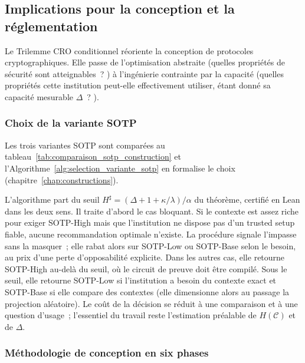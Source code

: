 \subsection{Implications pour la conception et la r\'eglementation}
\label{subsec:implications_conception}
\begin{sloppypar}
Le Trilemme CRO conditionnel r\'eoriente la conception de protocoles
cryptographiques. Elle passe de l'optimisation abstraite (\og quelles propri\'et\'es
de s\'ecurit\'e sont atteignables~? \fg) \`a l'ing\'enierie contrainte
par la capacit\'e (\og quelles propri\'et\'es cette institution peut-elle
effectivement utiliser, \'etant donn\'e sa capacit\'e mesurable
$\Delta$~? \fg).

\subsubsection{Choix de la variante SOTP}
\label{subsubsec:tableau_comparatif_sotp}\label{subsubsec:algo_selection_variante}

Les trois variantes SOTP sont compar\'ees au tableau~\ref{tab:comparaison_sotp_construction}
et l'Algorithme~\ref{alg:selection_variante_sotp} en formalise le choix
(chapitre~\ref{chap:constructions}).

L'algorithme part du seuil $H^\sharp = (\Delta + 1 + \kappa/\lambda)/\alpha$ du th\'eor\`eme,
certifi\'e en Lean dans les deux sens. Il traite d'abord le cas bloquant. Si le contexte
est assez riche pour exiger SOTP-High mais que l'institution ne dispose pas
d'un trusted setup fiable, aucune recommandation optimale n'existe. La
proc\'edure signale l'impasse sans la masquer~; elle rabat alors
sur SOTP-Low ou SOTP-Base selon le besoin, au prix d'une perte d'opposabilit\'e explicite. Dans les
autres cas, elle retourne SOTP-High au-del\`a du seuil, o\`u le circuit de preuve doit
\^etre compil\'e. Sous le seuil, elle retourne SOTP-Low si l'institution a besoin du
contexte exact et SOTP-Base si elle compare des contextes (elle dimensionne alors au
passage la projection al\'eatoire). Le co\^ut de la d\'ecision se r\'eduit \`a une
comparaison et \`a une question d'usage~; l'essentiel du travail reste l'estimation pr\'ealable de
$H(\mathcal{C})$ et de $\Delta$.

\subsubsection{M\'ethodologie de conception en six phases}
\label{subsubsec:methodologie_six_phases}


\end{sloppypar}
